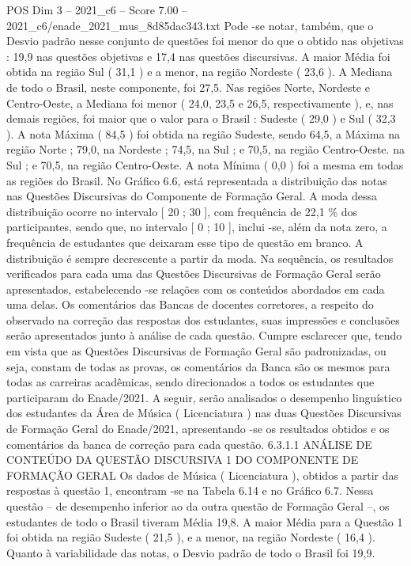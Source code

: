 \begin{textsample}{POS Dim 3 – 2021\_c6 – Score 7.00 – 2021\_c6/enade\_2021\_mus\_8d85dac343.txt}
Pode -se notar, também, que o Desvio padrão nesse conjunto de questões foi menor do que o obtido nas objetivas : 19,9 nas questões objetivas e 17,4 nas questões discursivas.
A maior Média foi obtida na região Sul ( 31,1 ) e a menor, na região Nordeste ( 23,6 ).
A Mediana de todo o Brasil, neste componente, foi 27,5.
Nas regiões Norte, Nordeste e Centro-Oeste, a Mediana foi menor ( 24,0, 23,5 e 26,5, respectivamente ), e, nas demais regiões, foi maior que o valor para o Brasil : Sudeste ( 29,0 ) e Sul ( 32,3 ).
A nota Máxima ( 84,5 ) foi obtida na região Sudeste, sendo 64,5, a Máxima na região Norte ; 79,0, na Nordeste ; 74,5, na Sul ; e 70,5, na região Centro-Oeste. na Sul ; e 70,5, na região Centro-Oeste.
A nota Mínima ( 0,0 ) foi a mesma em todas as regiões do Brasil.
No Gráfico 6.6, está representada a distribuição das notas nas Questões Discursivas do Componente de Formação Geral.
A moda dessa distribuição ocorre no intervalo [ 20 ; 30 ], com frequência de 22,1 \% dos participantes, sendo que, no intervalo [ 0 ; 10 ], inclui -se, além da nota zero, a frequência de estudantes que deixaram esse tipo de questão em branco.
A distribuição é sempre decrescente a partir da moda.
Na sequência, os resultados verificados para cada uma das Questões Discursivas de Formação Geral serão apresentados, estabelecendo -se relações com os conteúdos abordados em cada uma delas.
Os comentários das Bancas de docentes corretores, a respeito do observado na correção das respostas dos estudantes, suas impressões e conclusões serão apresentados junto à análise de cada questão.
Cumpre esclarecer que, tendo em vista que as Questões Discursivas de Formação Geral são padronizadas, ou seja, constam de todas as provas, os comentários da Banca são os mesmos para todas as carreiras acadêmicas, sendo direcionados a todos os estudantes que participaram do Enade/2021.
A seguir, serão analisados o desempenho linguístico dos estudantes da Área de Música ( Licenciatura ) nas duas Questões Discursivas de Formação Geral do Enade/2021, apresentando -se os resultados obtidos e os comentários da banca de correção para cada questão. 6.3.1.1 ANÁLISE DE CONTEÚDO DA QUESTÃO DISCURSIVA 1 DO COMPONENTE DE FORMAÇÃO GERAL Os dados de Música ( Licenciatura ), obtidos a partir das respostas à questão 1, encontram -se na Tabela 6.14 e no Gráfico 6.7.
Nessa questão – de desempenho inferior ao da outra questão de Formação Geral –, os estudantes de todo o Brasil tiveram Média 19,8.
A maior Média para a Questão 1 foi obtida na região Sudeste ( 21,5 ), e a menor, na região Nordeste ( 16,4 ).
Quanto à variabilidade das notas, o Desvio padrão de todo o Brasil foi 19,9.

\end{textsample}
